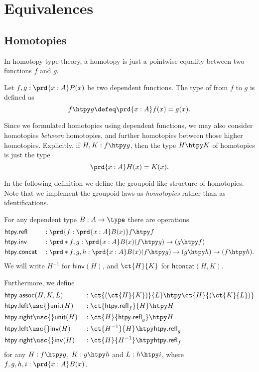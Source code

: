\chapter{Equivalences}

\section{Homotopies}
In homotopy type theory, a homotopy is just a pointwise equality between two functions $f$ and $g$.

\begin{defn}
Let $f,g:\prd{x:A}P(x)$ be two dependent functions. The type of  from $f$ to $g$ is defined as
\begin{equation*}
f\htpy g \defeq \prd{x:A} f(x)=g(x).
\end{equation*}
\end{defn}

Since we formulated homotopies using dependent functions, we may also consider homotopies \emph{between} homotopies, and further homotopies between those higher homotopies. 
Explicitly, if $H,K:f\htpy g$, then the type $H\htpy K$ of homotopies is just the type
\begin{equation*}
\prd{x:A} H(x)=K(x).
\end{equation*}

In the following definition we define the groupoid-like structure of homotopies. Note that we implement the groupoid-laws as \emph{homotopies} rather than as identifications.

\begin{defn}
For any dependent type $B:A\to\type$ there are operations
\begin{align*}
& \mathsf{htpy.refl} & & : \prd{f:\prd{x:A}B(x)}f\htpy f \\
& \mathsf{htpy.inv} & & : \prd*{f,g:\prd{x:A}B(x)} (f\htpy g)\to(g\htpy f) \\
& \mathsf{htpy.concat} & & : \prd*{f,g,h:\prd{x:A}B(x)} (f\htpy g)\to (g\htpy h)\to (f\htpy h).
\end{align*}
We will write $H^{-1}$ for $\mathsf{hinv}(H)$, and $\ct{H}{K}$ for $\mathsf{hconcat}(H,K)$. 

Furthermore, we define
\begin{align*}
& \mathsf{htpy.assoc}(H,K,L) & & : \ct{(\ct{H}{K})}{L}\htpy\ct{H}{(\ct{K}{L})} \\
& \mathsf{htpy.left\usc{}unit}(H) & & : \ct{\mathsf{htpy.refl}_f}{H}\htpy H \\
& \mathsf{htpy.right\usc{}unit}(H) & & : \ct{H}{\mathsf{htpy.refl}_g}\htpy H \\
& \mathsf{htpy.left\usc{}inv}(H) & & : \ct{H^{-1}}{H} \htpy \mathsf{htpy.refl}_g \\
& \mathsf{htpy.right\usc{}inv}(H) & & : \ct{H}{H^{-1}} \htpy \mathsf{htpy.refl}_f
\end{align*}
for any $H:f\htpy g$, $K:g\htpy h$ and $L:h\htpy i$, where $f,g,h,i:\prd{x:A}B(x)$.
\end{defn}



